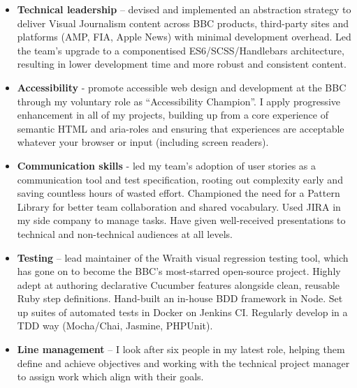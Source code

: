 \begin{itemize}
    \setlength\itemsep{0.3em}
    
    \item \textbf{Technical leadership} – devised and implemented an abstraction strategy to deliver Visual Journalism content across BBC products, third-party sites and platforms (AMP, FIA, Apple News) with minimal development overhead. Led the team's upgrade to a componentised ES6/SCSS/Handlebars architecture, resulting in lower development time and more robust and consistent content.
    
    \item\textbf{Accessibility} - promote accessible web design and development at the BBC through my voluntary role as ``Accessibility Champion''. I apply progressive enhancement in all of my projects, building up from a core experience of semantic HTML and aria-roles and ensuring that experiences are acceptable whatever your browser or input (including screen readers).

    \item \textbf{Communication skills} - led my team's adoption of user stories as a communication tool and test specification, rooting out complexity early and saving countless hours of wasted effort. Championed the need for a Pattern Library for better team collaboration and shared vocabulary. Used JIRA in my side company to manage tasks. Have given well-received presentations to technical and non-technical audiences at all levels.

    \item \textbf{Testing} – lead maintainer of the Wraith visual regression testing tool, which has gone on to become the BBC's most-starred open-source project. Highly adept at authoring declarative Cucumber features alongside clean, reusable Ruby step definitions. Hand-built an in-house BDD framework in Node. Set up suites of automated tests in Docker on Jenkins CI. Regularly develop in a TDD way (Mocha/Chai, Jasmine, PHPUnit).

    \item \textbf{Line management} – I look after six people in my latest role, helping them define and achieve objectives and working with the technical project manager to assign work which align with their goals.

\end{itemize}
